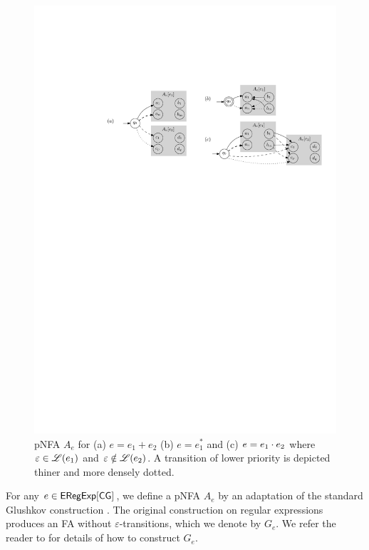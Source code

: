\begin{figure}
	\centering
	\includegraphics{pglushkov_01}
	\caption{pNFA $A_e$ for (a) $e=e_1+e_2$ (b) $e=e_1^{\ast}$ and (c) $e=e_1 \cdot e_2$ where $\varepsilon \in \mathscr{L}(e_1)$ and $\varepsilon \notin \mathscr{L}(e_2)$. A transition of lower priority is depicted thiner and more densely dotted. }
	\label{fig:pglushkov}
\end{figure}

For any $e \in {\sf ERegExp}[\sf CG]$, we define a pNFA $A_e$ by an adaptation of the standard
Glushkov construction \cite{Gluskov61}. The original construction on regular expressions
produces an FA without $\varepsilon$-transitions, which we denote by $G_e$.
We refer the reader to \cite{Gluskov61} for 
details of how to construct $G_e$. %

